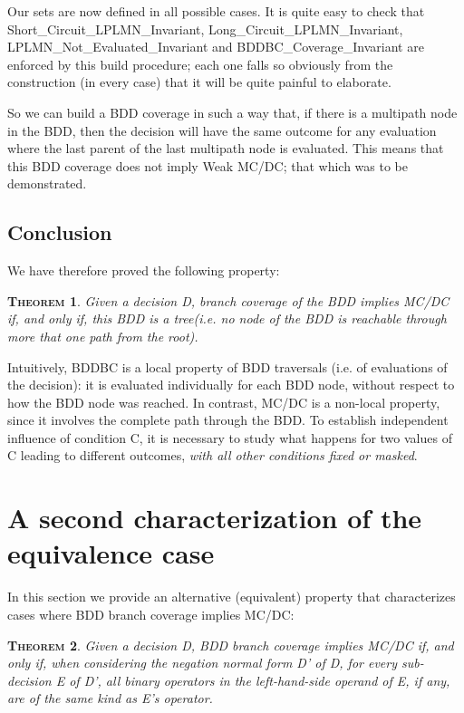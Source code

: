 \documentclass[a4paper,12pt,twoside]{article}
\newtheorem{theorem}{\textsc{Theorem}}
\begin{document}
Our sets are now defined in all possible cases. It is quite easy to
check that Short\_Circuit\_LPLMN\_Invariant,
Long\_Circuit\_LPLMN\_Invariant, LPLMN\_Not\_Evaluated\_Invariant and
BDDBC\_Coverage\_Invariant are enforced by this build procedure; each
one falls so obviously from the construction (in every case) that it
will be quite painful to elaborate.

So we can build a BDD coverage in such a way that, if there is a
multipath node in the BDD, then the decision will have the same outcome for
any evaluation where the last parent of the last multipath node is
evaluated. This means that this BDD coverage does not imply Weak
MC/DC; that which was to be demonstrated.

\subsection{Conclusion}

We have therefore proved the following property:

\begin{theorem}
  \label{thm:no-multipath-node}
  Given a decision D, branch coverage of the BDD implies MC/DC if,
  and only if, this BDD is a tree(i.e.  no node of the
  BDD is reachable through more that one path from the root).
\end{theorem}

Intuitively, BDDBC is a local property of BDD traversals (i.e. of
evaluations of the decision): it is evaluated individually for each
BDD node, without respect to how the BDD node was reached. In
contrast, MC/DC is a non-local property, since it involves the
complete path through the BDD. To establish independent influence of
condition C, it is necessary to study what happens for two values of C
leading to different outcomes, \emph{with all other conditions fixed
or masked}.

\section{A second characterization of the equivalence case}

In this section we provide an alternative (equivalent) property
that characterizes cases where BDD branch coverage implies MC/DC:

\begin{theorem}
  \label{thm:lhs-same-operator}
  Given a decision D, BDD branch coverage implies MC/DC if, and only if, when
  considering the negation normal form D' of D, for every sub-decision E of D',
  all binary operators in the left-hand-side operand of E, if any, are of the
  same kind as E's operator.
\end{theorem}
\end{document}
